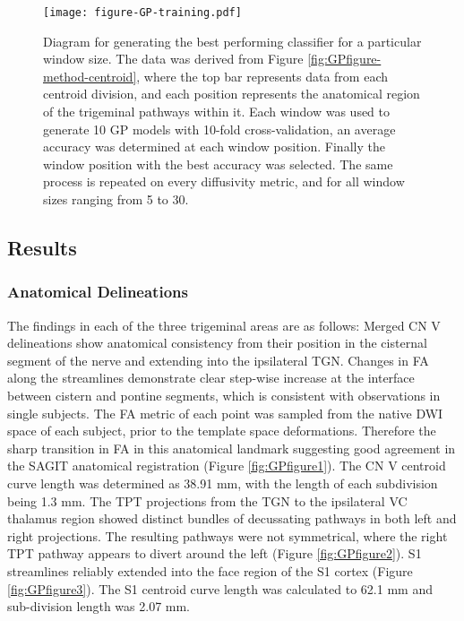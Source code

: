 \begin{figure}[ht]
\centering
\texttt{[image: figure-GP-training.pdf]}
\caption[Diagram for generating the best performing classifier for a particular window size.]{Diagram for generating the best performing classifier for a particular window size. The data was derived from Figure \ref{fig:GPfigure-method-centroid}, where the top bar represents data from each centroid division, and each position represents the anatomical region of the trigeminal pathways within it. Each window was used to generate 10 GP models with 10-fold cross-validation, an average accuracy was determined at each window position. Finally the window position with the best accuracy was selected. The same process is repeated on every diffusivity metric, and for all window sizes ranging from 5 to 30. }
\label{fig:GPfigure-gp-train}
\end{figure}

\subsection{Results}
\subsubsection{Anatomical Delineations}
The findings in each of the three trigeminal areas are as follows: Merged CN V delineations show anatomical consistency from their position in the cisternal segment of the nerve and extending into the ipsilateral TGN. Changes in FA along the streamlines demonstrate clear step-wise increase at the interface between cistern and pontine segments, which is consistent with observations in single subjects. The FA metric of each point was sampled from the native DWI space of each subject, prior to the template space deformations. Therefore the sharp transition in FA in this anatomical landmark suggesting good agreement in the SAGIT anatomical registration (Figure \ref{fig:GPfigure1}). The CN V centroid curve length was determined as 38.91 mm, with the length of each subdivision being 1.3 mm.
The TPT projections from the TGN to the ipsilateral VC thalamus region showed distinct bundles of decussating pathways in both left and right projections. The resulting pathways were not symmetrical, where the right TPT pathway appears to divert around the left (Figure \ref{fig:GPfigure2}).
S1 streamlines reliably extended into the face region of the S1 cortex (Figure \ref{fig:GPfigure3}). The S1 centroid curve length was calculated to 62.1 mm and sub-division length was 2.07 mm.


